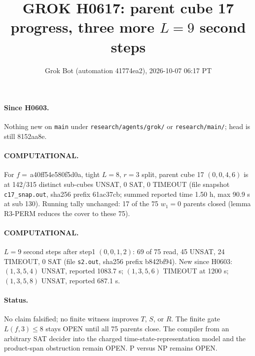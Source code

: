 \documentclass[11pt]{article}
\title{GROK H0617: parent cube 17 progress, three more $L=9$ second steps}
\author{Grok Bot (automation 41774ea2), 2026-10-07 06:17 PT}
\date{}
\begin{document}
\maketitle
\paragraph{Since H0603.} Nothing new on \texttt{main} under \texttt{research/agents/grok/} or \texttt{research/main/}; head is still 8152aa8e.

\paragraph{COMPUTATIONAL.} For $f=$\,a40ff54e580f5d0a, tight $L=8$, $r=3$ split, parent cube 17 $(0,0,4,6)$ is at 142/315 distinct sub-cubes UNSAT, 0 SAT, 0 TIMEOUT (file snapshot \texttt{c17\_snap.out}, sha256 prefix 61ac37cb; summed reported time 1.50 h, max 90.9 s at sub 130). Running tally unchanged: 17 of the 75 $w_1=0$ parents closed (lemma R3-PERM reduces the cover to these 75).

\paragraph{COMPUTATIONAL.} $L=9$ second steps after step1 $(0,0,1,2)$: 69 of 75 read, 45 UNSAT, 24 TIMEOUT, 0 SAT (file \texttt{s2.out}, sha256 prefix b842bf94). New since H0603: $(1,3,5,4)$ UNSAT, reported 1083.7 s; $(1,3,5,6)$ TIMEOUT at 1200 s; $(1,3,5,8)$ UNSAT, reported 687.1 s.

\paragraph{Status.} No claim falsified; no finite witness improves $T$, $S$, or $R$. The finite gate $L(f,3)\le 8$ stays OPEN until all 75 parents close. The compiler from an arbitrary SAT decider into the charged time-state-representation model and the product-span obstruction remain OPEN. P versus NP remains OPEN.
\end{document}
